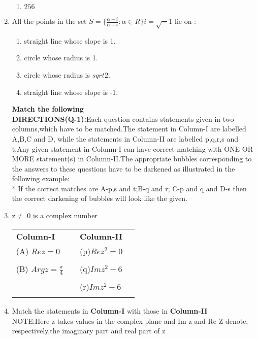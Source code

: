 \begin{enumerate}[label=\arabic*.,ref=\thesubsection.\theenumi]
\begin{enumerate}
    \item  $256$
    \end{enumerate}
    \item All the points in the set 
    $S=\{\frac{\alpha+i}{\alpha-i}:\alpha \in R\}i = \sqrt -1$ lie on  :
    \begin{enumerate}
    \item  straight line whose slope is 1.    
    \item  circle whose radius is 1.    
    \item  circle whose radius is $sqrt 2$.
    \item  straight line whose slope is -1.
    \end{enumerate}
    \onecolumn
    {\textbf{Match the following }}\\
{\textbf{DIRECTIONS(Q-1):}}{Each question contains statements given in two columns,which have to be matched.The statement in Column-I are labelled A,B,C and D, while the statements in Column-II are labelled p,q,r,s and t.Any given statement in Column-I can have correct matching with ONE OR MORE statement(s) in Column-II.The appropriate bubbles corresponding to the answers to these questions have to be darkened as illustrated in the following example:}\\*
If the correct matches are A-p,s and t;B-q and r; C-p and q and D-s then the correct darkening of bubbles will look like the given.
\item z$\neq$ 0 is a complex number\\
\begin{tabular}{llll}
\textbf{Column-I} &   \enspace   &   \textbf{Column-II}\\
(A) $Rez=0$ &   \enspace  &   (p)$Rez^2=0$\\
&&&\\
(B) $Argz=\frac{\pi}{4}$    &   \enspace   & (q)$Imz^2-6$\\
&&&\\
          &\enspace   &   (r)$Imz^2-6$\\
&&&\\
\end{tabular}
\item Match the statements in \textbf{Column-I} with those in \textbf{Column-II}\\
NOTE:Here z takes values in the complex plane and Im z and Re Z denote, respectively,the imaginary part and real part of z
\begin{tabular}{llll}

\end{tabular}
\end{enumerate}
